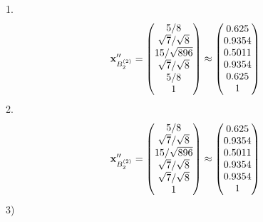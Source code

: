 \documentclass[10pt,a4paper]{article}
\begin{document}
	1.
	\[
		\bold{x}''_{B_2^{(2)}} = 
		\begin{pmatrix}
			{{5}} / {{8}} \\
			{\sqrt{7}} / {\sqrt{8}} \\
			{{15}} / {\sqrt{896}} \\
			{\sqrt{7}} / {\sqrt{8}} \\
			{{5}} / {{8}} \\
			{1}{} \\
		\end{pmatrix}
		\approx
		\begin{pmatrix}
			0.625    \\
			0.9354   \\
			0.5011   \\
			0.9354   \\
			0.625    \\
			1        \\
		\end{pmatrix}
	\]
	2.
	\[
		\bold{x}''_{B_2^{(2)}} = 
		\begin{pmatrix}
			{{5}} / {{8}} \\
			{\sqrt{7}} / {\sqrt{8}} \\
			{{15}} / {\sqrt{896}} \\
			{\sqrt{7}} / {\sqrt{8}} \\
			{\sqrt{7}} / {\sqrt{8}} \\
			{1}{} \\
		\end{pmatrix}
		\approx
		\begin{pmatrix}
			0.625    \\
			0.9354   \\
			0.5011   \\
			0.9354   \\
			0.9354   \\
			1        \\
		\end{pmatrix}
	\]
	3)
\end{document}

